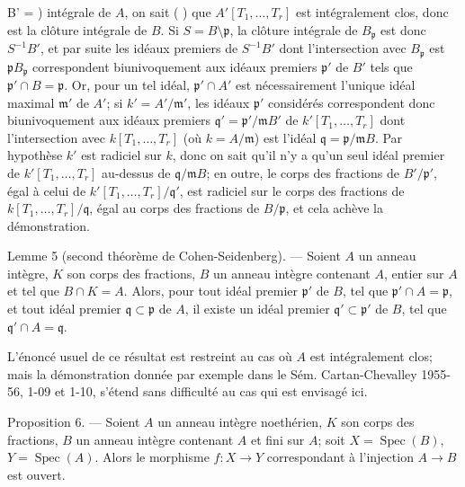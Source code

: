 \newpage


B' = )
intégrale de $A$, on sait ( ) que $A'[T_1, \dots, T_r]$ est intégralement clos, donc est la clôture intégrale de $B$. Si $S = B \setminus \mathfrak{p}$, la clôture intégrale de $B_{\mathfrak{p}}$ est donc $S^{-1}B'$, et par suite les idéaux premiers de $S^{-1}B'$ dont l'intersection avec $B_{\mathfrak{p}}$ est $\mathfrak{p}B_{\mathfrak{p}}$ correspondent biunivoquement aux idéaux premiers $\mathfrak{p}'$ de $B'$ tels que $\mathfrak{p}' \cap B = \mathfrak{p}$. Or, pour un tel idéal, $\mathfrak{p}' \cap A'$ est nécessairement l'unique idéal maximal $\mathfrak{m}'$ de $A'$; si $k' = A'/\mathfrak{m}'$, les idéaux $\mathfrak{p}'$ considérés correspondent donc biunivoquement aux idéaux premiers $\mathfrak{q}' = \mathfrak{p}'/\mathfrak{m}B'$ de $k'[T_1, \dots, T_r]$ dont l'intersection avec $k[T_1, \dots, T_r]$ (où $k = A/\mathfrak{m}$) est l'idéal $\mathfrak{q} = \mathfrak{p}/\mathfrak{m}B$. Par hypothèse $k'$ est radiciel sur $k$, donc on sait qu'il n'y a qu'un seul idéal premier de $k'[T_1, \dots, T_r]$ au-dessus de $\mathfrak{q}/\mathfrak{m}B$; en outre, le corps des fractions de $B'/\mathfrak{p}'$, égal à celui de $k'[T_1, \dots, T_r]/\mathfrak{q}'$, est radiciel sur le corps des fractions de $k[T_1, \dots, T_r]/\mathfrak{q}$, égal au corps des fractions de $B/\mathfrak{p}$, et cela achève la démonstration.

Lemme 5 (second théorème de Cohen-Seidenberg). — Soient $A$ un anneau intègre, $K$ son corps des fractions, $B$ un anneau intègre contenant $A$, entier sur $A$ et tel que $B \cap K = A$. Alors, pour tout idéal premier $\mathfrak{p}'$ de $B$, tel que $\mathfrak{p}' \cap A = \mathfrak{p}$, et tout idéal premier $\mathfrak{q} \subset \mathfrak{p}$ de $A$, il existe un idéal premier $\mathfrak{q}' \subset \mathfrak{p}'$ de $B$, tel que $\mathfrak{q}' \cap A = \mathfrak{q}$.

L'énoncé usuel de ce résultat est restreint au cas où $A$ est intégralement clos; mais la démonstration donnée par exemple dans le Sém. Cartan-Chevalley 1955-56, 1-09 et 1-10, s'étend sans difficulté au cas qui est envisagé ici.

Proposition 6. — Soient $A$ un anneau intègre noethérien, $K$ son corps des fractions, $B$ un anneau intègre contenant $A$ et fini sur $A$; soit $X = \operatorname{Spec}(B)$, $Y = \operatorname{Spec}(A)$. Alors le morphisme $f: X \to Y$ correspondant à l'injection $A \to B$ est ouvert.

